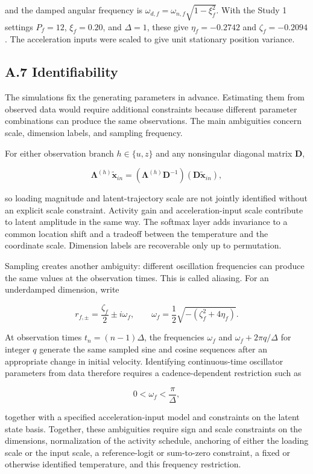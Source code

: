 \documentclass[
]{article}
\begin{document}
and the damped angular frequency is
\(\omega_{d,f}=\omega_{n,f}\sqrt{1-\xi_f^2}\). With the Study 1 settings
\(P_f=12\), \(\xi_f=0.20\), and \(\Delta=1\), these give
\(\eta_f=-0.2742\) and \(\zeta_f=-0.2094\). The acceleration inputs were
scaled to give unit stationary position variance.

\subsection{A.7 Identifiability}\label{a.7-identifiability}

The simulations fix the generating parameters in advance. Estimating
them from observed data would require additional constraints because
different parameter combinations can produce the same observations. The
main ambiguities concern scale, dimension labels, and sampling
frequency.

For either observation branch \(h\in\{u,z\}\) and any nonsingular
diagonal matrix \(\mathbf{D}\),

\[
\boldsymbol{\Lambda}^{(h)}\tilde{\mathbf{x}}_{in}
=(\boldsymbol{\Lambda}^{(h)}\mathbf{D}^{-1})(\mathbf{D}\tilde{\mathbf{x}}_{in}),
\]

so loading magnitude and latent-trajectory scale are not jointly
identified without an explicit scale constraint. Activity gain and
acceleration-input scale contribute to latent amplitude in the same way.
The softmax layer adds invariance to a common location shift and a
tradeoff between the temperature and the coordinate scale. Dimension
labels are recoverable only up to permutation.

Sampling creates another ambiguity: different oscillation frequencies
can produce the same values at the observation times. This is called
aliasing. For an underdamped dimension, write

\[
r_{f,\pm}=\frac{\zeta_f}{2}\pm i\omega_f,
\qquad
\omega_f=
\frac{1}{2}\sqrt{-(\zeta_f^2+4\eta_f)}.
\]

At observation times \(t_n=(n-1)\Delta\), the frequencies \(\omega_f\)
and \(\omega_f+2\pi q/\Delta\) for integer \(q\) generate the same
sampled sine and cosine sequences after an appropriate change in initial
velocity. Identifying continuous-time oscillator parameters from data
therefore requires a cadence-dependent restriction such as

\[
0<\omega_f<\frac{\pi}{\Delta},
\]

together with a specified acceleration-input model and constraints on
the latent state basis. Together, these ambiguities require sign and
scale constraints on the dimensions, normalization of the activity
schedule, anchoring of either the loading scale or the input scale, a
reference-logit or sum-to-zero constraint, a fixed or otherwise
identified temperature, and this frequency restriction.
\end{document}
